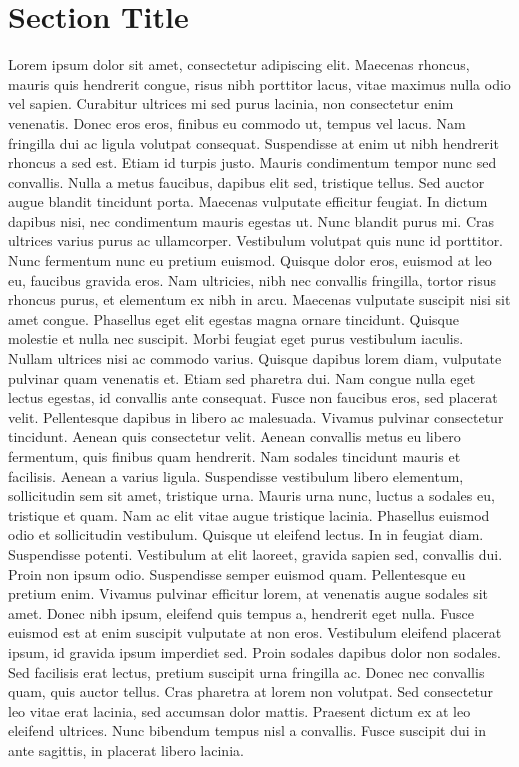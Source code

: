 \section{Section Title}
Lorem ipsum dolor sit amet, consectetur adipiscing elit. Maecenas rhoncus, mauris quis hendrerit congue, risus nibh porttitor lacus, vitae maximus nulla odio vel sapien. Curabitur ultrices mi sed purus lacinia, non consectetur enim venenatis. Donec eros eros, finibus eu commodo ut, tempus vel lacus. Nam fringilla dui ac ligula volutpat consequat. Suspendisse at enim ut nibh hendrerit rhoncus a sed est. Etiam id turpis justo. Mauris condimentum tempor nunc sed convallis. Nulla a metus faucibus, dapibus elit sed, tristique tellus. Sed auctor augue blandit tincidunt porta.
Maecenas vulputate efficitur feugiat. In dictum dapibus nisi, nec condimentum mauris egestas ut. Nunc blandit purus mi. Cras ultrices varius purus ac ullamcorper. Vestibulum volutpat quis nunc id porttitor. Nunc fermentum nunc eu pretium euismod. Quisque dolor eros, euismod at leo eu, faucibus gravida eros. Nam ultricies, nibh nec convallis fringilla, tortor risus rhoncus purus, et elementum ex nibh in arcu. Maecenas vulputate suscipit nisi sit amet congue. Phasellus eget elit egestas magna ornare tincidunt. Quisque molestie et nulla nec suscipit. Morbi feugiat eget purus vestibulum iaculis.
Nullam ultrices nisi ac commodo varius. Quisque dapibus lorem diam, vulputate pulvinar quam venenatis et. Etiam sed pharetra dui. Nam congue nulla eget lectus egestas, id convallis ante consequat. Fusce non faucibus eros, sed placerat velit. Pellentesque dapibus in libero ac malesuada. Vivamus pulvinar consectetur tincidunt. Aenean quis consectetur velit. Aenean convallis metus eu libero fermentum, quis finibus quam hendrerit. Nam sodales tincidunt mauris et facilisis. Aenean a varius ligula. Suspendisse vestibulum libero elementum, sollicitudin sem sit amet, tristique urna. Mauris urna nunc, luctus a sodales eu, tristique et quam.
Nam ac elit vitae augue tristique lacinia. Phasellus euismod odio et sollicitudin vestibulum. Quisque ut eleifend lectus. In in feugiat diam. Suspendisse potenti. Vestibulum at elit laoreet, gravida sapien sed, convallis dui. Proin non ipsum odio. Suspendisse semper euismod quam. Pellentesque eu pretium enim. Vivamus pulvinar efficitur lorem, at venenatis augue sodales sit amet. Donec nibh ipsum, eleifend quis tempus a, hendrerit eget nulla.
Fusce euismod est at enim suscipit vulputate at non eros. Vestibulum eleifend placerat ipsum, id gravida ipsum imperdiet sed. Proin sodales dapibus dolor non sodales. Sed facilisis erat lectus, pretium suscipit urna fringilla ac. Donec nec convallis quam, quis auctor tellus. Cras pharetra at lorem non volutpat. Sed consectetur leo vitae erat lacinia, sed accumsan dolor mattis. Praesent dictum ex at leo eleifend ultrices. Nunc bibendum tempus nisl a convallis. Fusce suscipit dui in ante sagittis, in placerat libero lacinia. 
